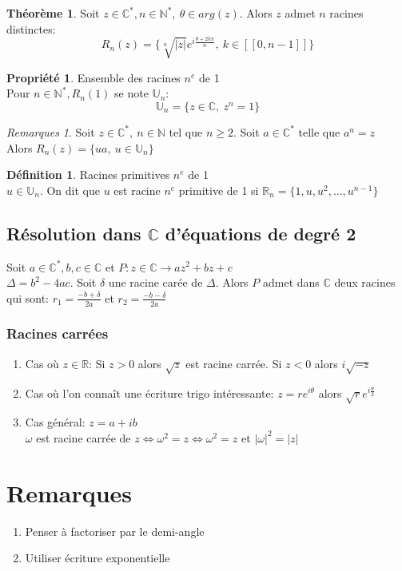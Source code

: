 \documentclass[fleqn]{article}
\theoremstyle{definition} \newtheorem*{defi}{D\'efinition}
\theoremstyle{definition} \newtheorem*{theo}{Th\'eor\`eme}
\theoremstyle{definition} \newtheorem*{coro}{Corollaire}
\theoremstyle{remark} \newtheorem*{rqs}{Remarques}
\theoremstyle{definition} \newtheorem*{prop}{Propri\'et\'e}
\begin{document}
\begin{theo} Soit $z \in \mathbb{C}^*, n \in \mathbb{N}^*,\ \theta \in arg(z)$. Alors $z$ admet $n$ racines distinctes:
	\[R_n(z) = \{\sqrt[n]{|z|}e^{i \frac{\theta + 2k\pi}{n}},\ k \in [\![0,n-1]\!] \}\]
\end{theo}

\begin{prop} Ensemble des racines $n^e$ de 1 \\
	Pour $n \in \mathbb{N}^*, R_n(1)$ se note $\mathbb{U}_n$:
	\[\mathbb{U}_n = \{z \in \mathbb{C},\ z^n = 1\}\]
\end{prop}

\begin{rqs}
	Soit $z \in \mathbb{C}^*,\ n \in \mathbb{N}$ tel que $n \geq 2$. Soit $a \in \mathbb{C}^*$ telle que $a^n = z$ \\
	Alors $R_n(z) = \{ua,\ u \in \mathbb{U}_n\}$
\end{rqs}

\begin{defi} Racines primitives $n^e$ de 1 \\
	$u \in \mathbb{U}_n$. On dit que $u$ est racine $n^e$ primitive de 1 si $\mathbb{R}_n = \{1, u, u^2, \hdots, u^{n-1}\}$
\end{defi}

\subsection{R\'esolution dans $\mathbb{C}$ d'\'equations de degr\'e 2}
Soit $a \in \mathbb{C}^*,b,c \in \mathbb{C}$ et $P: z \in \mathbb{C} \rightarrow az^2 + bz + c$ \\
$\Delta = b^2 -4ac$. Soit $\delta$ une racine car\'ee de $\Delta$. Alors $P$ admet dans $\mathbb{C}$ deux racines qui sont: $r_1 =
\frac{-b+\delta}{2a}$ et $r_2 = \frac{-b-\delta}{2a}$

\subsubsection{Racines carr\'ees}
\begin{enumerate}
	\item Cas o\`u $z \in \mathbb{R}$: Si $z > 0$ alors $\sqrt{z}$ est racine carr\'ee. Si $z < 0$ alors $i\sqrt{-z}$
	\item Cas o\`u l'on conna\^it une \'ecriture trigo int\'eressante: $z = re^{i\theta}$ alors $\sqrt{r}e^{i\frac{\theta}{2}}$
	\item Cas g\'en\'eral: $z = a + ib$ \\
		$\omega$ est racine carr\'ee de $z \Leftrightarrow \omega^2 = z \Leftrightarrow \omega^2 = z$ et $|\omega|^2 = |z|$
\end{enumerate}

\section{Remarques}
\begin{enumerate}
	\item Penser \`a factoriser par le demi-angle
	\item Utiliser \'ecriture exponentielle
\end{enumerate}
\end{document}
